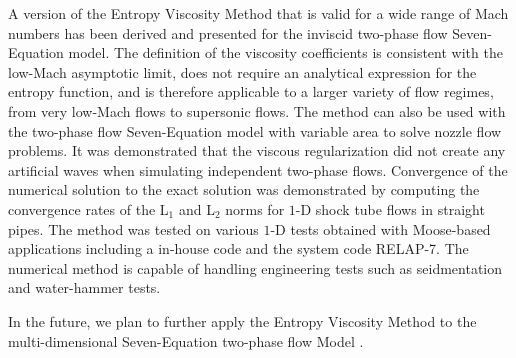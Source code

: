 \documentclass[preprint,10pt]{elsarticle}
\begin{document}
%
%
A version of the Entropy Viscosity Method that is valid for a wide range of Mach numbers has been derived 
and presented for the inviscid two-phase flow Seven-Equation model.
The definition of the viscosity coefficients
is consistent with the low-Mach asymptotic limit, does not require an analytical expression 
for the entropy function, and is therefore applicable to a larger variety of flow regimes, from very 
low-Mach flows to supersonic flows.
The method can also be used with the two-phase flow Seven-Equation model with variable area to solve nozzle flow problems.
It was demonstrated that the viscous regularization did not create any artificial waves when simulating independent two-phase flows.
Convergence of the numerical solution to the exact solution was demonstrated by computing the convergence rates of the L$_1$ and L$_2$ norms 
for $1$-D shock tube flows in straight pipes. The method was tested on various $1$-D tests obtained with Moose-based applications including a in-house code and the system code RELAP-7. The numerical method is capable of handling engineering tests such as seidmentation and water-hammer tests.


In the future, we plan to further apply the Entropy Viscosity Method 
to the multi-dimensional Seven-Equation two-phase flow Model \cite{Berry_NED2010}. 
%

\end{document}
